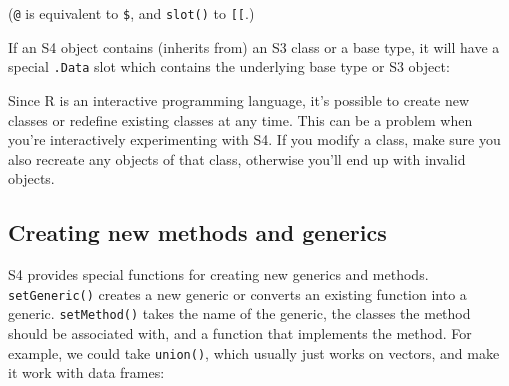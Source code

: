 (\texttt{@} is equivalent to \texttt{\$}, and \texttt{slot()} to
\texttt{{[}{[}}.)

If an S4 object contains (inherits from) an S3 class or a base type, it
will have a special \texttt{.Data} slot which contains the underlying
base type or S3 object: 

\begin{Shaded}
\begin{Highlighting}[]
\NormalTok{(}\NormalTok{,}
   \NormalTok{,}
   \NormalTok{(} \NormalTok{, } \NormalTok{))}
\StringTok{ }\NormalTok{(}\NormalTok{, }\NormalTok{:}\NormalTok{, } \NormalTok{, } \NormalTok{)}
\end{Highlighting}
\end{Shaded}

Since R is an interactive programming language, it's possible to create
new classes or redefine existing classes at any time. This can be a
problem when you're interactively experimenting with S4. If you modify a
class, make sure you also recreate any objects of that class, otherwise
you'll end up with invalid objects.

\subsection{Creating new methods and generics}

S4 provides special functions for creating new generics and methods.
\texttt{setGeneric()} creates a new generic or converts an existing
function into a generic. \texttt{setMethod()} takes the name of the
generic, the classes the method should be associated with, and a
function that implements the method. For example, we could take
\texttt{union()}, which usually just works on vectors, and make it work
with data frames:  
 

\begin{Shaded}
\begin{Highlighting}[]
\NormalTok{(}\NormalTok{)}
\NormalTok{(}\NormalTok{,}
  \NormalTok{(} \NormalTok{, } \NormalTok{),}
    \NormalTok{(}
  \NormalTok{\}}
\NormalTok{)}
\end{Highlighting}
\end{Shaded}

